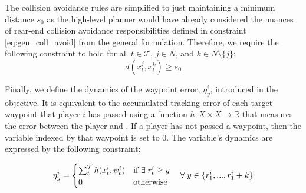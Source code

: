 The collision avoidance rules are simplified to just maintaining a minimum distance $s_0$ as the high-level planner would have already considered the nuances of rear-end collision avoidance responsibilities defined in constraint \eqref{eq:gen_coll_avoid} from the general formulation. Therefore, we require the following constraint to hold for all $t \in \mathcal{T}$, $j \in N$, and $k \in N \setminus \{j\}$:
\begin{equation} \label{eq:ll_coll_avoid}
    d(x^j_{t}, x^k_t) \geq s_0
\end{equation}

Finally, we define the dynamics of the waypoint error, $\eta^i_y$, introduced in the objective. It is equivalent to the accumulated tracking error of each target waypoint that player $i$ has passed using a function $h: X\times X \rightarrow \mathbb{R}$ that measures the error between the player and . If a player has not passed a waypoint, then the variable indexed by that waypoint is set to 0. The variable's dynamics are expressed by the following constraint:

\begin{equation} \label{eq:ll_wp_err}
    \eta^i_y = \begin{cases} \sum_{t}^{\Hat{\mathcal{T}}} h(x^i_t, \psi^i_{c})  & \text{if } \exists \; r^i_t \geq y \\
    0 & \text{otherwise}
    \end{cases} 
    \quad \forall \; y \in \{r^i_{1}, ..., r^i_{1} + k\}
\end{equation}

